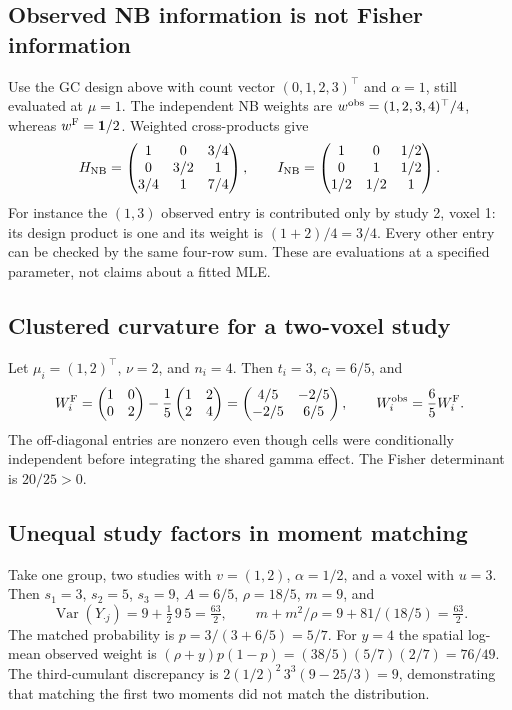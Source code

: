 \documentclass[11pt,a4paper]{article}
\newcommand{\Var}{\operatorname{Var}}
\numberwithin{equation}{section}
\begin{document}
\subsection{Observed NB information is not Fisher information}
Use the GC design above with count vector $(0,1,2,3)^\top$ and
$\alpha=1$, still evaluated at $\mu=1$.
The independent NB weights are
$w^{\rm obs}=(1,2,3,4)^\top/4$, whereas $w^{\rm F}=\mathbf1/2$.
Weighted cross-products give
\[
 H_{\rm NB}=
 \begin{pmatrix}
 1&0&3/4\\0&3/2&1\\3/4&1&7/4
 \end{pmatrix},
 \qquad
 I_{\rm NB}=
 \begin{pmatrix}1&0&1/2\\0&1&1/2\\1/2&1/2&1\end{pmatrix}.
\]
For instance the $(1,3)$ observed entry is contributed only by study 2,
voxel 1: its design product is one and its weight is $(1+2)/4=3/4$.
Every other entry can be checked by the same four-row sum.
These are evaluations at a specified parameter, not claims about a fitted MLE.

\subsection{Clustered curvature for a two-voxel study}
Let $\mu_i=(1,2)^\top$, $\nu=2$, and $n_i=4$.
Then $t_i=3$, $c_i=6/5$, and
\[
 W_i^{\rm F}
 =\begin{pmatrix}1&0\\0&2\end{pmatrix}
   -\frac15\begin{pmatrix}1&2\\2&4\end{pmatrix}
 =\begin{pmatrix}4/5&-2/5\\-2/5&6/5\end{pmatrix},
 \qquad W_i^{\rm obs}=\frac65W_i^{\rm F}.
\]
The off-diagonal entries are nonzero even though cells were conditionally
independent before integrating the shared gamma effect.
The Fisher determinant is $20/25>0$.

\subsection{Unequal study factors in moment matching}
Take one group, two studies with $v=(1,2)$, $\alpha=1/2$, and a voxel
with $u=3$. Then
$s_1=3$, $s_2=5$, $s_3=9$, $A=6/5$, $\rho=18/5$,
$m=9$, and
\[
 \Var(Y_{\cdot j})=9+\tfrac12\,9\,5=\tfrac{63}{2},
 \qquad
 m+m^2/\rho=9+81/(18/5)=\tfrac{63}{2}.
\]
The matched probability is $p=3/(3+6/5)=5/7$.
For $y=4$ the spatial log-mean observed weight is
$(\rho+y)p(1-p)=(38/5)(5/7)(2/7)=76/49$.
The third-cumulant discrepancy is
$2(1/2)^2\,3^3(9-25/3)=9$, demonstrating that matching the first
two moments did not match the distribution.
\end{document}
